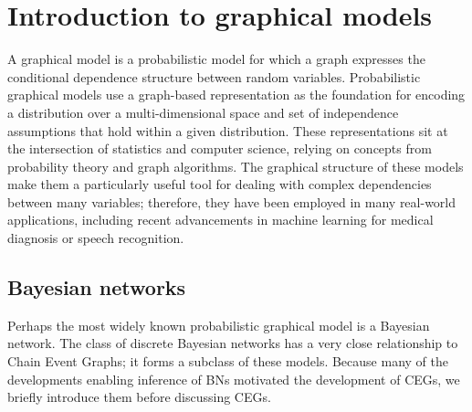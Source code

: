 \documentclass[runningheads]{llncs}
\begin{document}
%
%
\section{Introduction to graphical models}\label{subsec:graphicalintro}
A graphical model is a probabilistic model for which a graph expresses the conditional dependence structure between random variables. Probabilistic graphical models use a graph-based representation as the foundation for encoding a distribution over a multi-dimensional space and set of independence assumptions that hold within a given distribution. These representations sit at the intersection of statistics and computer science, relying on concepts from probability theory and graph algorithms. The graphical structure of these models make them a particularly useful tool for dealing with complex dependencies between many variables; therefore, they have been employed in many real-world applications, including recent advancements in machine learning for medical diagnosis or speech recognition.

\subsection{Bayesian networks}\label{subsec:bayesiannetworks}
Perhaps the most widely known probabilistic graphical model is a Bayesian network. The class of discrete Bayesian networks has a very close relationship to Chain Event Graphs; it forms a subclass of these models. Because many of the developments enabling inference of BNs motivated the development of CEGs, we briefly introduce them before discussing CEGs. 
\end{document}
